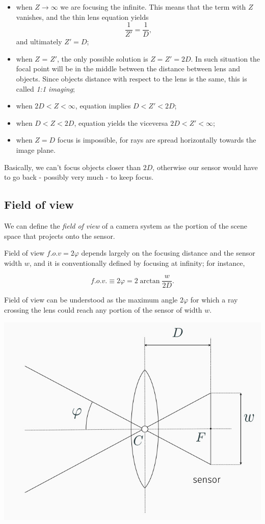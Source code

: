 \documentclass[10pt]{report}
\begin{document}
\begin{itemize}
\item when \(Z \longrightarrow \infty\) we are focusing the infinite. This
means that the term with \(Z\) vanishes, and the thin lens equation
yields \[ \frac{1}{Z'} = \frac{1}{D},\] and ultimately \(Z'=D\);
\item when \(Z\) = \(Z'\), the only possible solution is \(Z = Z' = 2D\). In
such situation the focal point will be in the middle between the
distance between lens and objects. Since objects distance with respect
to the lens is the same, this is called \emph{1:1 imaging};
\item when \(2D < Z < \infty\), equation implies \(D < Z' < 2D\);
\item when \(D < Z < 2D\), equation yields the viceversa \(2D < Z' < \infty\);
\item when \(Z = D\) focus is impossible, for rays are spread horizontally towards the image plane.
\end{itemize}

Basically, we can't focus objects closer than \(2D\), otherwise our
sensor would have to go back - possibly very much - to keep focus.

\subsection{Field of view}
\label{field-of-view}
We can define the \emph{field of view} of a camera system as the portion of
the scene space that projects onto the sensor.

Field of view \(f.o.v = 2\varphi\) depends largely on the focusing
distance and the sensor width \(w\), and it is conventionally defined by
focusing at infinity; for instance,

\[ f.o.v. \equiv 2\varphi = 2\arctan{\frac{w}{2D}}.\]

Field of view can be understood as the maximum angle \(2\varphi\) for
which a ray crossing the lens could reach any portion of the sensor of
width \(w\).

\begin{center}
\includegraphics[width=.9\linewidth]{./pics/visio/field-of-view.jpg}
\end{center}
\end{document}

